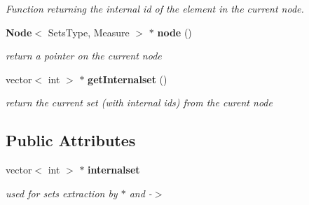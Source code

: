 \begin{CompactItemize}
\begin{CompactList}\small\item\em Function returning the internal id of the element in the current node. \item\end{CompactList}\item 
{\bf Node}$<$ Sets\-Type, Measure $>$ $\ast$ {\bf node} ()\label{class_it_p_tree_5633f67ecb2d18f15f8142a569cf407c}

\begin{CompactList}\small\item\em return a pointer on the current node \item\end{CompactList}\item 
vector$<$ int $>$ $\ast$ {\bf get\-Internalset} ()\label{class_it_p_tree_c13f15dd60dbc7f8a82214a49b8fc327}

\begin{CompactList}\small\item\em return the current set (with internal ids) from the curent node \item\end{CompactList}\end{CompactItemize}
\subsection*{Public Attributes}
\begin{CompactItemize}
\item 
vector$<$ int $>$ $\ast$ {\bf internalset}\label{class_it_p_tree_e6950df1aac78bcbe276e58e406fbc08}

\begin{CompactList}\small\item\em used for sets extraction by $\ast$ and -$>$ \item\end{CompactList}\end{CompactItemize}
